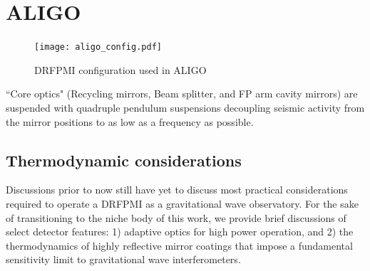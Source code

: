 \section{ALIGO}

\begin{figure}[H]
  \begin{center}
	  \texttt{[image: aligo\_config.pdf]}
  \end{center}
  \caption{DRFPMI configuration used in ALIGO}
  \label{fig:simple_michelson}
\end{figure}

``Core optics" (Recycling mirrors, Beam splitter, and FP arm cavity mirrors) are suspended with quadruple pendulum suspensions decoupling seismic activity from the mirror positions to as low as a frequency as possible. 

\subsection{Thermodynamic considerations}
Discussions prior to now still have yet to discuss most practical considerations required to operate a DRFPMI as a gravitational wave observatory. For the sake of transitioning to the niche body of this work, we provide brief discussions of select detector features: 1) adaptive optics for high power operation, and 2) the thermodynamics of highly reflective mirror coatings that impose a fundamental sensitivity limit to gravitational wave interferometers. 



